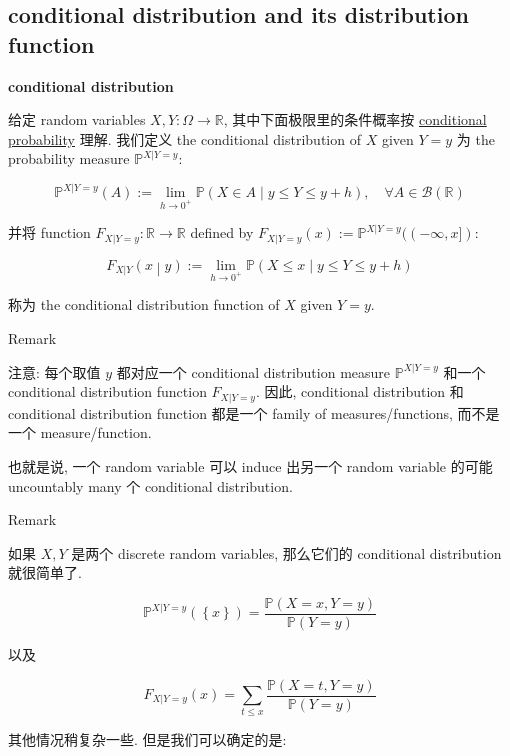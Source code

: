 \documentclass{qlnotes-export}
\begin{document}
\subsection{conditional distribution and its distribution function}\label{conditional-distribution-and-its-distribution-function}

\begin{definition}{\protect{}\label{kn-conditional-distribution}{\textbf{conditional
distribution}}}

给定 random variables \(X,Y:\Omega\rightarrow{\mathbb{R}}\), 其中下面极限里的条件概率按 \href{https://qiulinfan.github.io/notes/math/probability/\#kn-conditional-probability}{conditional probability} 理解. 我们定义 the conditional distribution of \(X\) given \(Y = y\) 为 the probability measure \({\mathbb{P}}^{X|Y = y}\):

\[{\mathbb{P}}^{X|Y = y}(A) := \lim\limits_{h\rightarrow 0^{+}}{\mathbb{P}}(X \in A \mid y \leq Y \leq y + h),\quad\forall A \in \mathcal{B}({\mathbb{R}})\]

并将 function \(F_{X|Y = y}:{\mathbb{R}}\rightarrow{\mathbb{R}}\) defined by \(F_{X|Y = y}(x) := {\mathbb{P}}^{X|Y = y}(( - \infty,x\rbrack)\):

\[\left. F_{X|Y}(x \middle| y) := \lim\limits_{h\rightarrow 0^{+}}{\mathbb{P}}(X \leq x \mid y \leq Y \leq y + h) \right.\]

称为 the conditional distribution function of \(X\) given \(Y = y\).

\end{definition}

\begin{qlremark}{Remark}

注意: 每个取值 \(y\) 都对应一个 conditional distribution measure \({\mathbb{P}}^{X|Y = y}\) 和一个 conditional distribution function \(F_{X|Y = y}\). 因此, conditional distribution 和 conditional distribution function 都是一个 family of measures/functions, 而不是一个 measure/function.

也就是说, 一个 random variable 可以 induce 出另一个 random variable 的可能 uncountably many 个 conditional distribution.

\end{qlremark}

\begin{qlremark}{Remark}

如果 \(X,Y\) 是两个 discrete random variables, 那么它们的 conditional distribution 就很简单了.

\[{\mathbb{P}}^{X|Y = y}(\left\{ x \right\}) = \frac{{\mathbb{P}}(X = x,Y = y)}{{\mathbb{P}}(Y = y)}\]

以及

\[F_{X|Y = y}(x) = \sum\limits_{t \leq x}\frac{{\mathbb{P}}(X = t,Y = y)}{{\mathbb{P}}(Y = y)}\]

其他情况稍复杂一些. 但是我们可以确定的是:

\end{qlremark}
\end{document}
